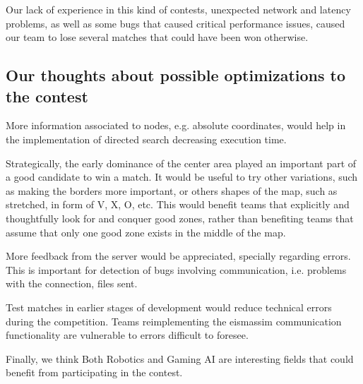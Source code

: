 \documentclass{llncs2e/llncs}
\begin{document}
    Our lack of experience in this kind of contests, unexpected network and
    latency problems, as well as some bugs that caused critical performance
    issues, caused our team to lose several matches that could have been won
    otherwise.

\subsection{Our thoughts about possible optimizations to the contest}
    
    More information associated to nodes, e.g. absolute coordinates, would help
    in the implementation of directed search decreasing execution time.

    Strategically, the early dominance of the center area played an important part 
    of a good candidate to win a match. It would be useful to try other 
    variations, such as making the borders more important, or others shapes of the 
    map, such as stretched, in form of V, X, O, etc. This would benefit teams that 
    explicitly and thoughtfully look for and conquer good zones, rather than 
    benefiting teams that assume that only one good zone exists in the middle of the map.

    More feedback from the server would be appreciated, specially
    regarding errors. This is important for detection of bugs
    involving communication, i.e. problems with the connection, files sent.

    Test matches in earlier stages of development would reduce technical
    errors during the competition.  Teams reimplementing the eismassim
    communication functionality are vulnerable to errors difficult to foresee. 
    
    Finally, we think Both Robotics and Gaming AI are interesting fields that could 
    benefit from participating in the contest.

    
 
 


\end{document}
